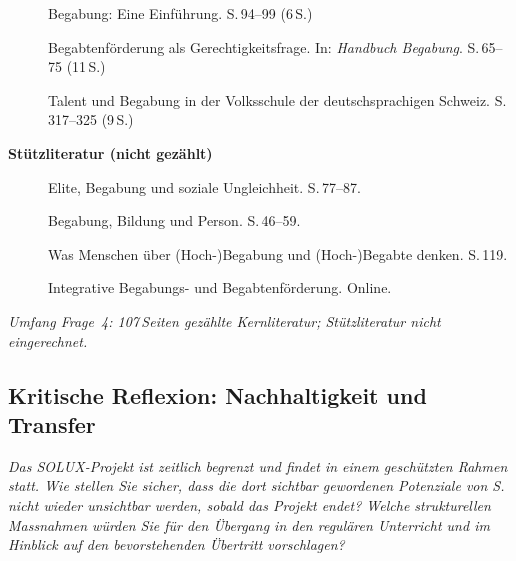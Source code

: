 \documentclass[ngerman, a4paper]{article}
\begin{document}
\begin{description}
  \item[\cite{hoyer2013begabung}]
        Begabung: Eine Einführung.
        S.\,94--99 (6\,S.)

  \item[\cite{sedmak2021bildungsgerechtigkeit}]
        Begabtenförderung als Gerechtigkeitsfrage.
        In: \textit{Handbuch Begabung}. S.\,65--75 (11\,S.)

  \item[\cite{grossenbacher2014integrative}]
        Talent und Begabung in der Volksschule der deutschsprachigen Schweiz.
        S.\,317--325 (9\,S.)

\end{description}

\textbf{Stützliteratur (nicht gezählt)}

\begin{description}
  \item[\cite{horvath2021elite}]
        Elite, Begabung und soziale Ungleichheit. S.\,77--87.

  \item[\cite{weigand2021person}]
        Begabung, Bildung und Person. S.\,46--59.

  \item[\cite{baudson2021wasdenken}]
        Was Menschen über (Hoch-)Begabung und (Hoch-)Begabte denken. S.\,119.

  \item[\cite{dvs2025bbf}] Integrative Begabungs- und
        Begabtenförderung. Online.
\end{description}

\textit{Umfang Frage~4: 107\,Seiten gezählte Kernliteratur; Stützliteratur nicht eingerechnet.}




\subsection{Kritische Reflexion: Nachhaltigkeit und Transfer}


\begin{tcolorbox}[colback=gray!5, colframe=gray!50, title=Weiterführende Diskurslinie]
  \itshape
  Das SOLUX-Projekt ist zeitlich begrenzt und findet in einem geschützten Rahmen statt.
  Wie stellen Sie sicher, dass die dort sichtbar gewordenen Potenziale von S. nicht
  wieder unsichtbar werden, sobald das Projekt endet? Welche strukturellen Massnahmen
  würden Sie für den Übergang in den regulären Unterricht und im Hinblick auf den
  bevorstehenden Übertritt vorschlagen?
\end{tcolorbox}
\end{document}
